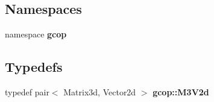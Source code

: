 \subsection*{\-Namespaces}
\begin{DoxyCompactItemize}
\item 
namespace {\bf gcop}
\end{DoxyCompactItemize}
\subsection*{\-Typedefs}
\begin{DoxyCompactItemize}
\item 
typedef pair$<$ \-Matrix3d, \-Vector2d $>$ {\bf gcop\-::\-M3\-V2d}
\end{DoxyCompactItemize}
